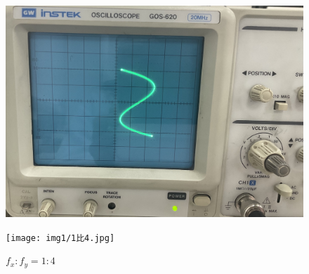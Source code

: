 \documentclass[UTF8]{ctexart}
\begin{document}
\begin{figure}[H]
	\begin{minipage}{0.49\linewidth}
		\centering
		\includegraphics[width=0.9\linewidth]{img1/3比1.jpg}
		\caption*{$f_x:f_y=3:1$}
	\end{minipage}
	\begin{minipage}{0.49\linewidth}
		\centering
		\texttt{[image: img1/1比4.jpg]}
		\caption*{$f_x:f_y=1:4$}
	\end{minipage}
\end{figure}
\end{document}
